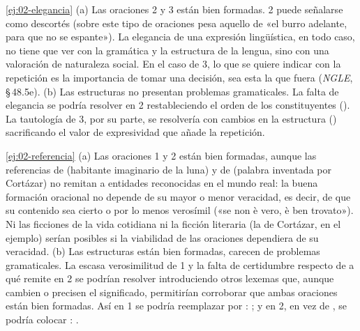 \begin{solucion}{\ref{ej:02-elegancia}}
(a) Las oraciones 2 y 3 están bien formadas. 2 puede señalarse como descortés
(sobre este tipo de oraciones pesa aquello de «el burro adelante, para que no se
espante»). La elegancia de una expresión lingüística, en todo caso, no tiene que
ver con la gramática y la estructura de la lengua, sino con una valoración de
naturaleza social. En el caso de 3, lo que se quiere indicar con la repetición
es la importancia de tomar una decisión, sea esta la que fuera (\textit{NGLE},
§\,48.5e). (b) Las estructuras no presentan problemas gramaticales. La falta de
elegancia se podría resolver en 2 restableciendo el orden de los constituyentes
(). La
tautología de 3, por su parte, se resolvería con cambios en la estructura
()
sacrificando el valor de expresividad que añade la repetición.
\end{solucion}

\begin{solucion}{\ref{ej:02-referencia}}
(a) Las oraciones 1 y 2 están bien formadas, aunque las referencias de
 (habitante imaginario de la luna) y de 
(palabra inventada por Cortázar) no remitan a entidades reconocidas en el mundo
real: la buena formación oracional no depende de su mayor o menor veracidad, es
decir, de que su contenido sea cierto o por lo menos verosímil («se non è vero,
è ben trovato»). Ni las ficciones de la vida cotidiana ni la ficción literaria
(la de Cortázar, en el ejemplo) serían posibles si la viabilidad de las
oraciones dependiera de su veracidad. (b) Las estructuras están bien formadas,
carecen de problemas gramaticales. La escasa verosimilitud de 1 y la falta de
certidumbre respecto de a qué remite  en 2 se podrían
resolver introduciendo otros lexemas que, aunque cambien o precisen el
significado, permitirían corroborar que ambas oraciones están bien formadas. Así
en 1 se podría reemplazar  por : ; y en 2, en vez de ,
se podría colocar : .
\end{solucion}

